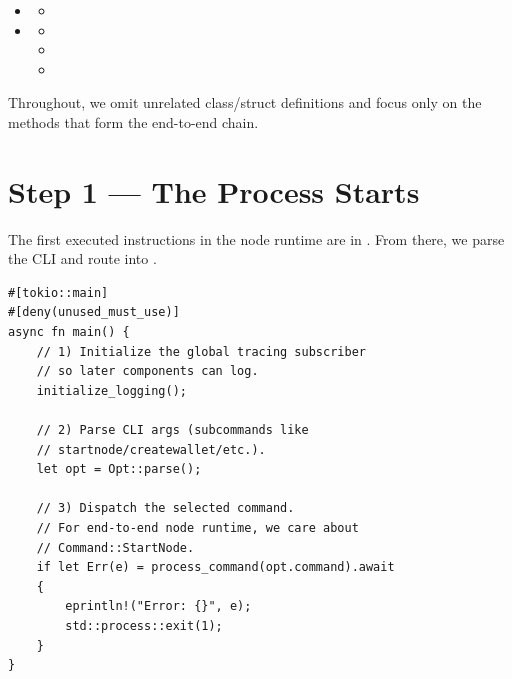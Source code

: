 \begin{itemize}
  \item {}
    \begin{itemize}
      \item {}
    \end{itemize}

  \item {}
    \begin{itemize}
      \item {}
      \item {}
      \item {}
    \end{itemize}
\end{itemize}

Throughout, we omit unrelated class/struct definitions and focus only on the methods that form the end-to-end chain.

\section{Step 1 --- The Process Starts}
\label{sec:ch09-9-step1}

The first executed instructions in the node runtime are in . From there, we parse the CLI and route into .

\begin{listing}[htbp]
\caption{Process entrypoint ()}
\label{lst:9-9-1}
\begin{verbatim}
#[tokio::main]
#[deny(unused_must_use)]
async fn main() {
    // 1) Initialize the global tracing subscriber
    // so later components can log.
    initialize_logging();

    // 2) Parse CLI args (subcommands like
    // startnode/createwallet/etc.).
    let opt = Opt::parse();

    // 3) Dispatch the selected command.
    // For end-to-end node runtime, we care about
    // Command::StartNode.
    if let Err(e) = process_command(opt.command).await
    {
        eprintln!("Error: {}", e);
        std::process::exit(1);
    }
}
\end{verbatim}
\end{listing}

